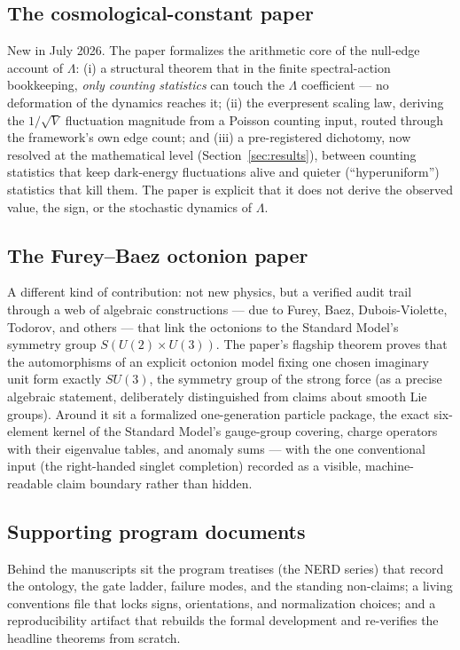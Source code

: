 \documentclass[11pt]{article}
\newcommand{\Lam}{\Lambda}
\begin{document}
\subsection{The cosmological-constant paper}

New in July 2026.  The paper formalizes the arithmetic core of the
null-edge account of $\Lam$: (i) a structural theorem that in the finite
spectral-action bookkeeping, \emph{only counting statistics} can touch the
$\Lam$ coefficient --- no deformation of the dynamics reaches it; (ii) the
everpresent scaling law, deriving the $1/\sqrt V$ fluctuation magnitude
from a Poisson counting input, routed through the framework's own edge
count; and (iii) a pre-registered dichotomy, now resolved at the
mathematical level (Section~\ref{sec:results}), between counting
statistics that keep dark-energy fluctuations alive and quieter
(``hyperuniform'') statistics that kill them.  The paper is explicit that
it does not derive the observed value, the sign, or the stochastic
dynamics of $\Lam$.

\subsection{The Furey--Baez octonion paper}

A different kind of contribution: not new physics, but a verified audit
trail through a web of algebraic constructions --- due to Furey, Baez,
Dubois-Violette, Todorov, and others --- that link the octonions to the
Standard Model's symmetry group $S(U(2)\times U(3))$.  The paper's
flagship theorem proves that the automorphisms of an explicit octonion
model fixing one chosen imaginary unit form exactly $SU(3)$, the symmetry
group of the strong force (as a precise algebraic statement, deliberately
distinguished from claims about smooth Lie groups).  Around it sit a
formalized one-generation particle package, the exact six-element kernel
of the Standard Model's gauge-group covering, charge operators with their
eigenvalue tables, and anomaly sums --- with the one conventional input
(the right-handed singlet completion) recorded as a visible,
machine-readable claim boundary rather than hidden.

\subsection{Supporting program documents}

Behind the manuscripts sit the program treatises (the NERD series) that
record the ontology, the gate ladder, failure modes, and the standing
non-claims; a living conventions file that locks signs, orientations, and
normalization choices; and a reproducibility artifact that rebuilds the
formal development and re-verifies the headline theorems from scratch.
\end{document}
